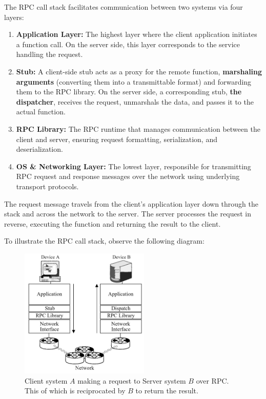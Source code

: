 \begin{Def}

    The RPC call stack facilitates communication between two systems via four layers:
    
    \begin{enumerate}
        \item \textbf{Application Layer:} The highest layer where the client application initiates a function call. On the server side, this layer corresponds to the service handling the request.
        
        \item \textbf{Stub:} A client-side stub acts as a proxy for the remote function, \textbf{marshaling arguments} (converting them into a transmittable format) and forwarding them to the RPC library. On the server side,
        a corresponding stub, \textbf{the dispatcher}, receives the request, unmarshals the data, and passes it to the actual function.
        
        \item \textbf{RPC Library:} The RPC runtime that manages communication between the client and server, ensuring request formatting, serialization, and deserialization.
        
        \item \textbf{OS \& Networking Layer:} The lowest layer, responsible for transmitting RPC request and response messages over the network using underlying transport protocols.
    \end{enumerate}
    
    The request message travels from the client's application layer down through the stack and across the network to the server. The server processes the request in reverse, executing the function and returning the result to the client.
\end{Def}
    
\newpage 

\noindent
To illustrate the RPC call stack, observe the following diagram:
\begin{figure}[h]
    \centering
    \includegraphics[width=0.55\textwidth]{Sections/rpc/rpc_stack.png}
    \caption{Client system $A$ making a request to Server system $B$ over RPC. This of which is 
    reciprocated by $B$ to return the result.}
    \label{fig:rpc_stack}
\end{figure}

